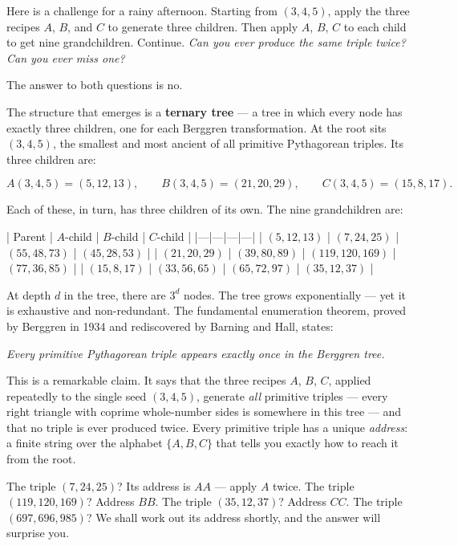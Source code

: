 \documentclass[11pt,openright,twoside]{book}
\renewenvironment{quotation}{%
  \par\vspace{8pt}%
  \begin{list}{}{%
    \setlength{\leftmargin}{2em}%
    \setlength{\rightmargin}{2em}%
  }\item[]\itshape\color{pullquote}%
}{%
  \end{list}%
  \par\vspace{8pt}%
}
\theoremstyle{definition}
\begin{document}
Here is a challenge for a rainy afternoon. Starting from $(3, 4, 5)$, apply the three recipes $A$, $B$, and $C$ to generate three children. Then apply $A$, $B$, $C$ to each child to get nine grandchildren. Continue. \textit{Can you ever produce the same triple twice? Can you ever miss one?}

The answer to both questions is no.

The structure that emerges is a \textbf{ternary tree} --- a tree in which every node has exactly three children, one for each Berggren transformation. At the root sits $(3, 4, 5)$, the smallest and most ancient of all primitive Pythagorean triples. Its three children are:

\[A(3,4,5) = (5, 12, 13), \qquad B(3,4,5) = (21, 20, 29), \qquad C(3,4,5) = (15, 8, 17).\]

Each of these, in turn, has three children of its own. The nine grandchildren are:

| Parent | $A$-child | $B$-child | $C$-child |
|---|---|---|---|
| $(5, 12, 13)$ | $(7, 24, 25)$ | $(55, 48, 73)$ | $(45, 28, 53)$ |
| $(21, 20, 29)$ | $(39, 80, 89)$ | $(119, 120, 169)$ | $(77, 36, 85)$ |
| $(15, 8, 17)$ | $(33, 56, 65)$ | $(65, 72, 97)$ | $(35, 12, 37)$ |

At depth $d$ in the tree, there are $3^d$ nodes. The tree grows exponentially --- yet it is exhaustive and non-redundant. The fundamental enumeration theorem, proved by Berggren in 1934 and rediscovered by Barning and Hall, states:

\begin{quotation}
\noindent\itshape \textit{Every primitive Pythagorean triple appears exactly once in the Berggren tree.}
\end{quotation}

This is a remarkable claim. It says that the three recipes $A$, $B$, $C$, applied repeatedly to the single seed $(3, 4, 5)$, generate \textit{all} primitive triples --- every right triangle with coprime whole-number sides is somewhere in this tree --- and that no triple is ever produced twice. Every primitive triple has a unique \textit{address}: a finite string over the alphabet $\{A, B, C\}$ that tells you exactly how to reach it from the root.

The triple $(7, 24, 25)$? Its address is $AA$ --- apply $A$ twice. The triple $(119, 120, 169)$? Address $BB$. The triple $(35, 12, 37)$? Address $CC$. The triple $(697, 696, 985)$? We shall work out its address shortly, and the answer will surprise you.
\end{document}
